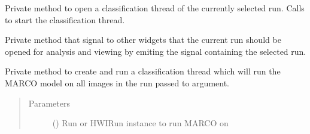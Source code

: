 \documentclass[letterpaper,10pt,english]{sphinxmanual}
\begin{document}
\begin{fulllineitems}
\begin{fulllineitems}
\label{\detokenize{polo.widgets:polo.widgets.run_organizer.RunOrganizer._handle_classification_request}}
Private method to open a classification thread of the currently selected run.
Calls  {\hyperref[\detokenize{polo.widgets:polo.widgets.run_organizer.RunOrganizer._open_classification_thread}]{}} to
start the classification thread.

\end{fulllineitems}


\begin{fulllineitems}
\label{\detokenize{polo.widgets:polo.widgets.run_organizer.RunOrganizer._handle_opening_run}}
Private method that signal to other widgets that the current run should be opened
for analysis and viewing by emiting the  signal containing
the selected run.

\end{fulllineitems}


\begin{fulllineitems}
\label{\detokenize{polo.widgets:polo.widgets.run_organizer.RunOrganizer._open_classification_thread}}
Private method to create and run a classification thread which will run
the MARCO model on all images in the run passed to  argument.
\begin{quote}\begin{description}
\item[{Parameters}] \leavevmode
{} ({\hyperref[\detokenize{polo.crystallography:polo.crystallography.run.Run}]{}}) \textendash{} Run or HWIRun instance to run MARCO on


\end{description}
\end{quote}
\end{fulllineitems}
\end{fulllineitems}
\end{document}
